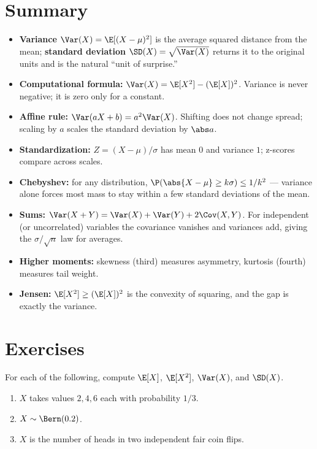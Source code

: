 \section*{Summary}

\begin{itemize}
  \item \textbf{Variance} $\Var(X) = \E[(X-\mu)^2]$ is the average squared
        distance from the mean; \textbf{standard deviation}
        $\SD(X)=\sqrt{\Var(X)}$ returns it to the original units and is the
        natural ``unit of surprise.''
  \item \textbf{Computational formula:}
        $\Var(X) = \E[X^2] - (\E[X])^2$. Variance is never negative; it is
        zero only for a constant.
  \item \textbf{Affine rule:} $\Var(aX+b) = a^2\Var(X)$. Shifting does not
        change spread; scaling by $a$ scales the standard deviation by
        $\abs a$.
  \item \textbf{Standardization:} $Z = (X-\mu)/\sigma$ has mean $0$ and
        variance $1$; z-scores compare across scales.
  \item \textbf{Chebyshev:} for any distribution,
        $\P(\abs{X-\mu}\ge k\sigma)\le 1/k^2$ --- variance alone forces most
        mass to stay within a few standard deviations of the mean.
  \item \textbf{Sums:} $\Var(X+Y) = \Var(X)+\Var(Y)+2\Cov(X,Y)$. For
        independent (or uncorrelated) variables the covariance vanishes and
        variances add, giving the $\sigma/\sqrt n$ law for averages.
  \item \textbf{Higher moments:} skewness (third) measures asymmetry,
        kurtosis (fourth) measures tail weight.
  \item \textbf{Jensen:} $\E[X^2]\ge(\E[X])^2$ is the convexity of squaring,
        and the gap is exactly the variance.
\end{itemize}

\section{Exercises}
\label{ch09:exercises}

\begin{exercise}
\label{ch09:exr-warmup}
For each of the following, compute $\E[X]$, $\E[X^2]$, $\Var(X)$, and
$\SD(X)$.
\begin{enumerate}
  \item $X$ takes values $2, 4, 6$ each with probability $1/3$.
  \item $X \sim \Bern(0.2)$.
  \item $X$ is the number of heads in two independent fair coin flips.
\end{enumerate}
\end{exercise}


